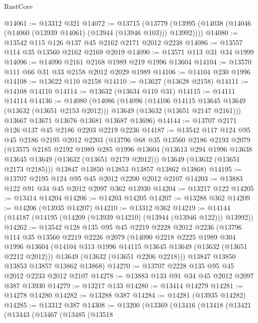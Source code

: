 \begin{lexlean}{RustCore}
\begin{coremodule}
@14061 := @13312 @321
@14072 := @13715
    (@13779 (@13995 (@14038 (@14046 (@14060 (@13939 @14061) (@13944 (@13946 @103))) @13992))))
@14080 := @13542 @115 @126 @137 @45 @2162 @2171 @2012 @2238
@14086 := @13557 @114 @35 @13560 @2162 @2169 @2019
@14090 := @13571 @113 @31 @34 @1999
@14096 := @14090 @2161 @2168 @1989 @219 @1996 @13604
@14104 := @13570 @111 @66 @31 @33 @2158 @2012 @2029 @1989
@14106 := @14104 @230 @1996
@14108 := @13622 @110 @2158
@14110 := @13627 (@13628 @2158)
@14111 := @14108 @14110
@14114 := @13632 (@13634 @110 @31)
@14115 := @14111 @14114
@14136 := @14080
    (@14086
      (@14096
        (@14106 @14115 @13645 @13649 (@13632 (@13651 @2153 @2012)))
        @13649
        (@13632 (@13651 @2147 @2161)))
      @13667
      @13671
      @13676
      @13681
      @13687
      @13696)
@14144 := @13707 @2171 @126 @137 @45 @2186 @2203 @2219 @2236
@14187 := @13542
    @117
    @124
    @95
    @45
    @2186
    @2195
    @2012
    @2203
    (@13796
      @68
      @35
      @13560
      @2186
      @2193
      @2079
      (@13575
        @2185
        @2192
        @1989
        @285
        @1996
        @13604
        (@13613 @294 @1996 @13638 @13645 @13649 (@13632 (@13651 @2179 @2012)))
        @13649
        (@13632 (@13651 @2173 @2185)))
      @13847
      @13850
      @13853
      @13857
      @13862
      @13868)
@14195 := @13707 @2195 @124 @95 @45 @2012 @2200 @2012 @2107
@14203 := @13883 @122 @91 @34 @45 @2012 @2097 @362 @13930
@14204 := @13217 @122
@14205 := @13414 @14204
@14206 := @14203 @14205
@14207 := @13288 @362
@14209 := @14206 (@13935 @14207)
@14210 := @13312 @362
@14219 := @14144 (@14187 (@14195 (@14209 (@13939 @14210) (@13944 (@13946 @122))) @13992))
@14262 := @13542
    @128
    @135
    @95
    @45
    @2219
    @2228
    @2012
    @2236
    (@13796
      @114
      @35
      @13560
      @2219
      @2226
      @2079
      (@14090
        @2218
        @2225
        @1989
        @304
        @1996
        @13604
        (@14104 @313 @1996 @14115 @13645 @13649 (@13632 (@13651 @2212 @2012)))
        @13649
        (@13632 (@13651 @2206 @2218)))
      @13847
      @13850
      @13853
      @13857
      @13862
      @13868)
@14270 := @13707 @2228 @135 @95 @45 @2012 @2233 @2012 @2107
@14278 := @13883 @133 @91 @34 @45 @2012 @2097 @387 @13930
@14279 := @13217 @133
@14280 := @13414 @14279
@14281 := @14278 @14280
@14282 := @13288 @387
@14284 := @14281 (@13935 @14282)
@14285 := @13312 @387
@14308 := @13200
    (@13369
      (@13416
        (@13418
          (@13421
            (@13443
              (@13467
                (@13485
                  (@13518

\end{coremodule}
\end{lexlean}
